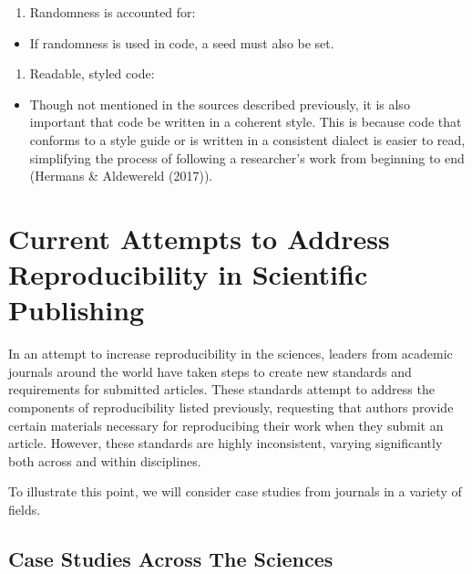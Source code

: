 \documentclass[12pt,twoside]{reedthesis}
\providecommand{\tightlist}{%
  \setlength{\itemsep}{0pt}\setlength{\parskip}{0pt}}
\begin{document}
\begin{enumerate}
\def\labelenumi{\arabic{enumi}.}
\setcounter{enumi}{4}
\tightlist
\item
  Randomness is accounted for:
\end{enumerate}
\begin{itemize}
\tightlist
\item
  If randomness is used in code, a seed must also be set.
\end{itemize}
\begin{enumerate}
\def\labelenumi{\arabic{enumi}.}
\setcounter{enumi}{5}
\tightlist
\item
  Readable, styled code:
\end{enumerate}
\begin{itemize}
\tightlist
\item
  Though not mentioned in the sources described previously, it is also
  important that code be written in a coherent style. This is because
  code that conforms to a style guide or is written in a consistent
  dialect is easier to read, simplifying the process of following a
  researcher's work from beginning to end (Hermans \& Aldewereld
  (2017)).
\end{itemize}
\section{Current Attempts to Address Reproducibility in Scientific
Publishing}\label{current-attempts-to-address-reproducibility-in-scientific-publishing}

In an attempt to increase reproducibility in the sciences, leaders from
academic journals around the world have taken steps to create new
standards and requirements for submitted articles. These standards
attempt to address the components of reproducibility listed previously,
requesting that authors provide certain materials necessary for
reproducibing their work when they submit an article. However, these
standards are highly inconsistent, varying significantly both across and
within disciplines.

To illustrate this point, we will consider case studies from journals in
a variety of fields.

\subsection{Case Studies Across The
Sciences}\label{case-studies-across-the-sciences}
\end{document}
